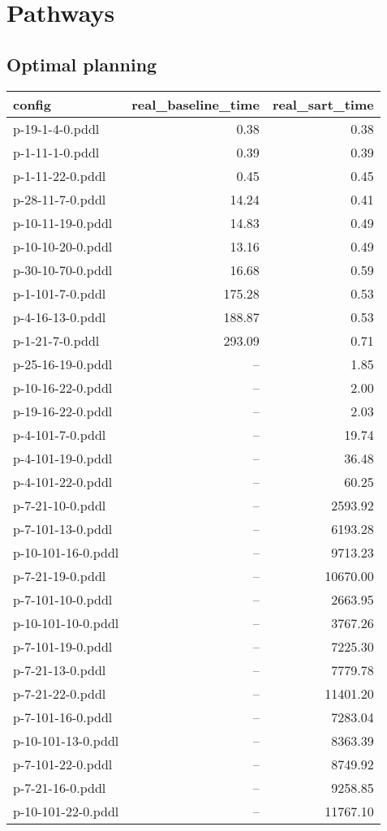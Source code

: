 \documentclass{article}
\begin{document}
                \newpage \section{Pathways}
                    \subsection*{Optimal planning}
                    
                            \begin{center}
                            \scriptsize
                            \begin{tabular}{@{}l|r|r@{}}
                            config & real\_baseline\_time & real\_sart\_time\\\midrule
                             p-19-1-4-0.pddl&0.38&0.38\\
 p-1-11-1-0.pddl&0.39&0.39\\
 p-1-11-22-0.pddl&0.45&0.45\\
 p-28-11-7-0.pddl&14.24&0.41\\
 p-10-11-19-0.pddl&14.83&0.49\\
 p-10-10-20-0.pddl&13.16&0.49\\
 p-30-10-70-0.pddl&16.68&0.59\\
 p-1-101-7-0.pddl&175.28&0.53\\
 p-4-16-13-0.pddl&188.87&0.53\\
 p-1-21-7-0.pddl&293.09&0.71\\
 p-25-16-19-0.pddl&--&1.85\\
 p-10-16-22-0.pddl&--&2.00\\
 p-19-16-22-0.pddl&--&2.03\\
 p-4-101-7-0.pddl&--&19.74\\
 p-4-101-19-0.pddl&--&36.48\\
 p-4-101-22-0.pddl&--&60.25\\
 p-7-21-10-0.pddl&--&2593.92\\
 p-7-101-13-0.pddl&--&6193.28\\
 p-10-101-16-0.pddl&--&9713.23\\
 p-7-21-19-0.pddl&--&10670.00\\
 p-7-101-10-0.pddl&--&2663.95\\
 p-10-101-10-0.pddl&--&3767.26\\
 p-7-101-19-0.pddl&--&7225.30\\
 p-7-21-13-0.pddl&--&7779.78\\
 p-7-21-22-0.pddl&--&11401.20\\
 p-7-101-16-0.pddl&--&7283.04\\
 p-10-101-13-0.pddl&--&8363.39\\
 p-7-101-22-0.pddl&--&8749.92\\
 p-7-21-16-0.pddl&--&9258.85\\
 p-10-101-22-0.pddl&--&11767.10
                            \end{tabular}
                            \end{center}
                    
\end{document}
